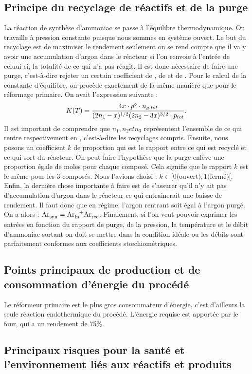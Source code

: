 \subsection{Principe du recyclage de réactifs et de la purge}
La réaction de synthèse d'ammoniac se passe à l'équilibre thermodynamique.
On travaille à pression constante puisque nous sommes en système ouvert. 
Le but du recyclage est de maximiser le rendement seulement on se rend 
compte que il  va y avoir une accumulation d'argon dans le réacteur si 
l'on renvoie à l'entrée de celuui-ci, la totalité de ce qui n'a pas réagit. 
Il est donc nécessaire de faire une purge, c'est-à-dire rejeter un certain 
coefficient de , de  et de . Pour le calcul de la constante
d'équilibre, on procède exactement de la même manière que pour le réformage primaire. 
On avait l'expression suivante : 
$$K(T) = \frac{4x\cdot p^{\circ} \cdot n_{g,tot}}{(2n_1 - x)^{1/2} (2n_2 - 3x)^{3/2} \cdot p_{tot}}.$$
Il est important de comprendre que $n_1, n_2 et n_3$ représentent l'ensemble
de ce qui rentre respectivement en , c'est-à-dire les recyclages compris.
Ensuite, nous posons un coefficient $k$ de proportion qui est le rapport
entre ce qui est recyclé et ce qui sort du réacteur. On peut faire l'hypothèse
que la purge enlève une proportion égale de moles pour chaque composé. Cela 
signifie que le rapport $k$ est le même pour les 3 composés. Nous l'avions 
choisi : $k \in [0 \text{(ouvert)}, 1 \text{(fermé)}[$.
Enfin, la dernière chose importante à  faire est de s'assurer qu'il n'y ait pas
d'accumulation d'argon dans le réacteur ce qui entrainerait une baisse de rendement. 
Il faut donc que en régime, l'argon rentrant soit égal à l'argon purgé. On a alors : 
$\ce{Ar_{syn}} = \ce{Ar_{in}+Ar_{rec}}$. 
Finalement, si l'on veut pouvoir exprimer les entrées en fonction du rapport de 
purge, de la pression, la température et le débit d'ammoniac sortant on doit se 
mettre dans la condition idéale ou les débits sont parfaitement conformes aux
coefficients stœchiométriques.

\subsection{Points principaux de production et de consommation d'énergie du procédé}
Le réformeur primaire est le plus gros consommateur d'énergie, c'est d'ailleurs
la seule réaction endothermique du procédé. L'énergie requise est apportée par
le four, qui a un rendement de 75\%.

\subsection{Principaux risques pour la santé et l'environnement liés aux réactifs et produits}
